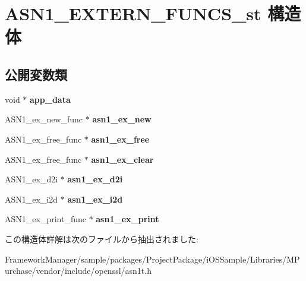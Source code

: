 \hypertarget{struct_a_s_n1___e_x_t_e_r_n___f_u_n_c_s__st}{}\section{A\+S\+N1\+\_\+\+E\+X\+T\+E\+R\+N\+\_\+\+F\+U\+N\+C\+S\+\_\+st 構造体}
\label{struct_a_s_n1___e_x_t_e_r_n___f_u_n_c_s__st}
\subsection*{公開変数類}
\begin{DoxyCompactItemize}
\item 
\hypertarget{struct_a_s_n1___e_x_t_e_r_n___f_u_n_c_s__st_aeab59571882fc1a035b3e68ea20eb8ab}{}void $\ast$ {\bfseries app\+\_\+data}\label{struct_a_s_n1___e_x_t_e_r_n___f_u_n_c_s__st_aeab59571882fc1a035b3e68ea20eb8ab}

\item 
\hypertarget{struct_a_s_n1___e_x_t_e_r_n___f_u_n_c_s__st_aaba71f535decc929f44857651b39934c}{}A\+S\+N1\+\_\+ex\+\_\+new\+\_\+func $\ast$ {\bfseries asn1\+\_\+ex\+\_\+new}\label{struct_a_s_n1___e_x_t_e_r_n___f_u_n_c_s__st_aaba71f535decc929f44857651b39934c}

\item 
\hypertarget{struct_a_s_n1___e_x_t_e_r_n___f_u_n_c_s__st_abdcdceb05e0645c60431380e0161eb51}{}A\+S\+N1\+\_\+ex\+\_\+free\+\_\+func $\ast$ {\bfseries asn1\+\_\+ex\+\_\+free}\label{struct_a_s_n1___e_x_t_e_r_n___f_u_n_c_s__st_abdcdceb05e0645c60431380e0161eb51}

\item 
\hypertarget{struct_a_s_n1___e_x_t_e_r_n___f_u_n_c_s__st_ad72f18057e4903c853d2a9cad4b8ea15}{}A\+S\+N1\+\_\+ex\+\_\+free\+\_\+func $\ast$ {\bfseries asn1\+\_\+ex\+\_\+clear}\label{struct_a_s_n1___e_x_t_e_r_n___f_u_n_c_s__st_ad72f18057e4903c853d2a9cad4b8ea15}

\item 
\hypertarget{struct_a_s_n1___e_x_t_e_r_n___f_u_n_c_s__st_a21a25960f9687e7456623303538a03f5}{}A\+S\+N1\+\_\+ex\+\_\+d2i $\ast$ {\bfseries asn1\+\_\+ex\+\_\+d2i}\label{struct_a_s_n1___e_x_t_e_r_n___f_u_n_c_s__st_a21a25960f9687e7456623303538a03f5}

\item 
\hypertarget{struct_a_s_n1___e_x_t_e_r_n___f_u_n_c_s__st_a62c0513bce357e37e73318f641f6b74c}{}A\+S\+N1\+\_\+ex\+\_\+i2d $\ast$ {\bfseries asn1\+\_\+ex\+\_\+i2d}\label{struct_a_s_n1___e_x_t_e_r_n___f_u_n_c_s__st_a62c0513bce357e37e73318f641f6b74c}

\item 
\hypertarget{struct_a_s_n1___e_x_t_e_r_n___f_u_n_c_s__st_a9609c50686e5385236dd12796813ec0e}{}A\+S\+N1\+\_\+ex\+\_\+print\+\_\+func $\ast$ {\bfseries asn1\+\_\+ex\+\_\+print}\label{struct_a_s_n1___e_x_t_e_r_n___f_u_n_c_s__st_a9609c50686e5385236dd12796813ec0e}

\end{DoxyCompactItemize}


この構造体詳解は次のファイルから抽出されました\+:\begin{DoxyCompactItemize}
\item 
Framework\+Manager/sample/packages/\+Project\+Package/i\+O\+S\+Sample/\+Libraries/\+M\+Purchase/vendor/include/openssl/asn1t.\+h\end{DoxyCompactItemize}
